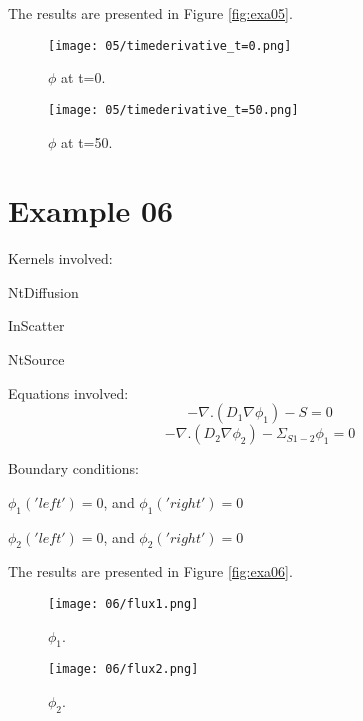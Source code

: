 \documentclass[11pt,letterpaper]{article}
\begin{document}
The results are presented in Figure \ref{fig:exa05}.
\begin{figure*}[!h]
	\centering
	\begin{subfigure}[t]{0.4\textwidth}
		\centering
		\texttt{[image: 05/timederivative\_t=0.png]} 
		\caption{$\phi$ at t=0.}
		\label{fig:exa01-flux1}
	\end{subfigure}
	\vspace{1cm}
	\begin{subfigure}[t]{0.4\textwidth}
		\centering
		\texttt{[image: 05/timederivative\_t=50.png]} 
		\caption{$\phi$ at t=50.}
		\label{fig:exa01-flux2}
	\end{subfigure}
	\hfill
	\caption{Flux.}
	\label{fig:exa05}
\end{figure*}

\newpage
\section{Example 06}

Kernels involved:
\begin{description}[font=$\bullet$\scshape\bfseries]
	\item[] NtDiffusion
    \item[] InScatter
    \item[] NtSource
\end{description}

Equations involved:
\begin{equation}
-\nabla.(D_{1}\nabla \phi_{1})-S=0
\end{equation}
\begin{equation}
-\nabla.(D_{2}\nabla \phi_{2})-\Sigma_{S 1-2}\phi_{1}=0
\end{equation}

Boundary conditions:
\begin{description}[]
	\item[] $\phi_{1}('left')=0$, and $\phi_{1}('right')=0$
	\item[] $\phi_{2}('left')=0$, and $\phi_{2}('right')=0$
\end{description}

The results are presented in Figure \ref{fig:exa06}.
\begin{figure*}[!h]
	\centering
	\begin{subfigure}[t]{0.4\textwidth}
		\centering
		\texttt{[image: 06/flux1.png]} 
		\caption{$\phi_{1}$.}
		\label{fig:exa06-flux1}
	\end{subfigure}
	\vspace{1cm}
	\begin{subfigure}[t]{0.4\textwidth}
		\centering
		\texttt{[image: 06/flux2.png]} 
		\caption{$\phi_{2}$.}
		\label{fig:exa06-flux2}
	\end{subfigure}
	\hfill
	\caption{Flux.}
	\label{fig:exa06}
\end{figure*}
\end{document}
